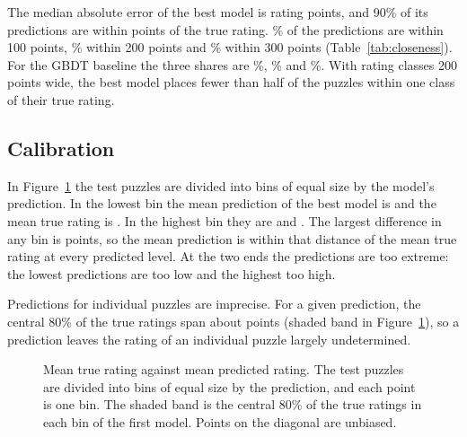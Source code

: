 \documentclass[11pt]{article}
\begin{document}
The median absolute error of the best model is  rating
points, and 90\% of its predictions are within  points of
the true rating. \% of the predictions are within
100 points, \% within 200 points and
\% within 300 points (Table~\ref{tab:closeness}).
For the GBDT baseline the three shares are
\%, \% and
\%. With rating classes 200 points wide, the
best model places fewer than half of the puzzles within one class of their
true rating.

\begin{table}[htbp]\centering\small
{}
\caption{Distribution of the absolute errors on the test set: the median,
the 90th percentile, and the share of predictions within 100, 200 and 300
rating points of the true rating.}
\label{tab:closeness}
\end{table}

\subsection{Calibration}

In Figure~\ref{fig:reliability} the test puzzles are divided into
 bins of equal size by the model's prediction. In
the lowest bin the mean prediction of the best model is
 and the mean true rating is
. In the highest bin they are
 and .
The largest difference in any bin is  points,
so the mean prediction is within that distance of the mean true rating at
every predicted level. At the two ends the predictions are too extreme: the
lowest predictions are too low and the highest too high.

Predictions for individual puzzles are imprecise. For a given prediction, the
central 80\% of the true ratings span about 
points (shaded band in Figure~\ref{fig:reliability}), so a prediction leaves
the rating of an individual puzzle largely undetermined.

\begin{figure}[htbp]\centering
{}
\caption{Mean true rating against mean predicted rating. The test puzzles
are divided into bins of equal size by the prediction, and each point is one
bin. The shaded band is the central 80\% of the true ratings in each bin of
the first model. Points on the diagonal are unbiased.}
\label{fig:reliability}
\end{figure}
\end{document}
